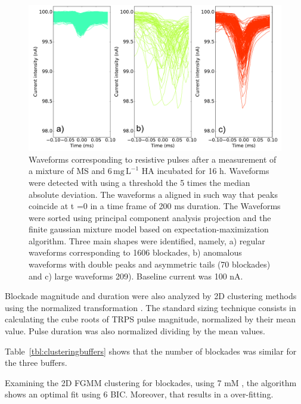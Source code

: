 \documentclass[journal=langd5,manuscript=article]{achemso}
\begin{document}
 \begin{figure}
  \includegraphics[width=\linewidth]{Figures/Block_sorting_HA6_T16.pdf}
  \caption{Waveforms corresponding to resistive pulses  after a measurement of a mixture of MS and $\mathrm{6\, mg\, L^{-1}}$ HA incubated for 16 h. Waveforms were detected with using a threshold the 5 times the median absolute deviation. The waveforms a aligned in such way that peaks coincide at t =0 in a time frame  of 200 ms duration. The Waveforms were sorted using principal component analysis projection  and the finite gaussian mixture model based on expectation-maximization algorithm. Three main shapes were identified, namely,  a) regular waveforms corresponding to 1606 blockades, b) anomalous waveforms with double peaks and asymmetric tails (70 blockades) and c) large waveforms 209). Baseline current was 100 nA.}
\label{fgr:block_sorting_HA6_T16}
\end{figure}


Blockade magnitude and duration were also analyzed  by 2D clustering methods using the normalized transformation \cite{Weatherall2016,VogelQuantitativeSizing2011}. The  standard sizing technique consists in calculating the cube roots of TRPS pulse magnitude, normalized by their mean value. Pulse duration was also normalized  dividing by the mean values.

Table~\ref{tbl:clusteringbuffers} shows that the number of blockades was similar for the three buffers.

Examining the 2D FGMM  clustering  for blockades, using 7 mM , the algorithm shows an optimal fit using 6 BIC. Moreover, that results in a over-fitting.   
\end{document}

